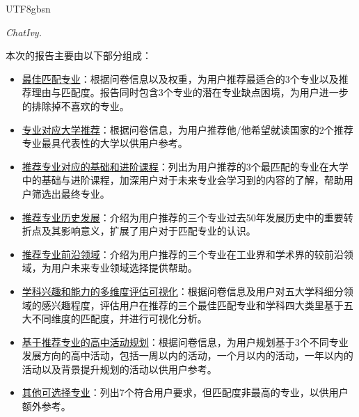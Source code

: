 \documentclass[12pt]{article}
\begin{document}
\begin{CJK*}{UTF8}{gbsn}
   \newpage
   \fancyfoot[C]{\thepage}
   \vspace*{2cm}
   \begin{flushleft}
   \textit{\textnormal{ChatIvy.}}
   \end{flushleft}
   \newpage
   \hspace{0pt}
   \vspace{0cm}
   
   \begin{flushleft}
   本次的报告主要由以下部分组成：
   \begin{itemize} 
       \item \underline{最佳匹配专业}：根据问卷信息以及权重，为用户推荐最适合的3个专业以及推荐理由与匹配度。报告同时包含3个专业的潜在专业缺点困境，为用户进一步的排除掉不喜欢的专业。
       \item \underline{专业对应大学推荐}：根据问卷信息，为用户推荐他/他希望就读国家的2个推荐专业最具代表性的大学以供用户参考。
       \item \underline{推荐专业对应的基础和进阶课程}：列出为用户推荐的3个最匹配的专业在大学中的基础与进阶课程，加深用户对于未来专业会学习到的内容的了解，帮助用户筛选出最终专业。
       \item \underline{推荐专业历史发展}：介绍为用户推荐的三个专业过去50年发展历史中的重要转折点及其影响意义，扩展了用户对于匹配专业的认识。
       \item \underline{推荐专业前沿领域}：介绍为用户推荐的三个专业在工业界和学术界的较前沿领域，为用户未来专业领域选择提供帮助。
       \item \underline{学科兴趣和能力的多维度评估可视化}：根据问卷信息及用户对五大学科细分领域的感兴趣程度，评估用户在推荐的三个最佳匹配专业和学科四大类里基于五大不同维度的匹配度，并进行可视化分析。
       \item \underline{基于推荐专业的高中活动规划}：根据问卷信息，为用户规划基于3个不同专业发展方向的高中活动，包括一周以内的活动，一个月以内的活动，一年以内的活动以及背景提升规划的活动以供用户参考。
       \item \underline{其他可选择专业}：列出7个符合用户要求，但匹配度非最高的专业，以供用户额外参考。
   \end{itemize}
   \end{flushleft}
   \hspace{0pt}
   \vfill
   




\end{CJK*}
\end{document}
